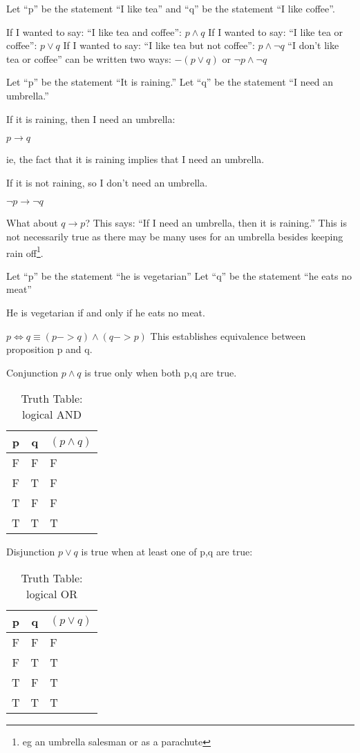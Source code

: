 Let ``p'' be the statement ``I like tea'' and ``q'' be the statement ``I like
coffee''.

If I wanted to say: ``I like tea and coffee'': $p \land q$
If I wanted to say: ``I like tea or coffee'': $p \lor q$
If I wanted to say: ``I like tea but not coffee'': $p \land \lnot q$
``I don't like tea or coffee'' can be written two ways: $ -(p \lor q)$ or $\lnot p
\land \lnot q $

Let ``p'' be the statement ``It is raining.''
Let ``q'' be the statement ``I need an umbrella.''

If it is raining, then I need an umbrella:

$ p \to q $

ie, the fact that it is raining implies that I need an umbrella.

If it is not raining, so I don't need an umbrella.

$ \lnot p \to \lnot q $

What about $q \to p$?
This says: ``If I need an umbrella, then it is raining.'' This is not
necessarily true as there may be many uses for an umbrella besides keeping rain
off\footnote{eg an umbrella salesman or as a parachute}.

Let ``p'' be the statement ``he is vegetarian''
Let ``q'' be the statement ``he eats no meat''

He is vegetarian if and only if he eats no meat.

$ p \iff q \equiv (p -> q) \land (q -> p)$
This establishes equivalence between proposition p and q.


Conjunction $p \land q$ is true only when both p,q are true.
\begin{table}[!htb]
\label{tab:TruthTableAND}
\begin{tabularx}{\linewidth}{| c | c | X |} \hline
  p & q & $(p \land q)$ \\ \hline \hline
  F & F & F \\ \hline
  F & T & F \\ \hline
  T & F & F \\ \hline
  T & T & T \\ \hline
\end{tabularx}
\caption{Truth Table: logical AND}
\end{table}

Disjunction $p \lor q$ is true when at least one of p,q are true:
\begin{table}[!htb]
\label{tab:TruthTableOR}
\begin{tabularx}{\linewidth}{| c | c | X |} \hline
  p & q & $(p \lor q)$ \\ \hline \hline
  F & F & F \\ \hline
  F & T & T \\ \hline
  T & F & T \\ \hline
  T & T & T \\ \hline
\end{tabularx}
\caption{Truth Table: logical OR}
\end{table}

